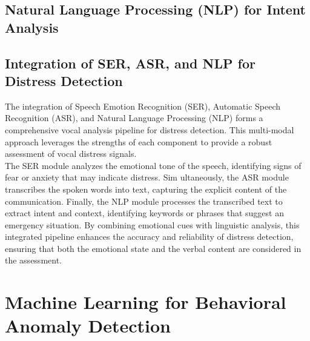\documentclass[12pt,a4paper,oneside,english]{book}
\begin{document}
{\subsection{Natural Language Processing (NLP) for Intent Analysis}%
\label{sec:nlp_intent}
%
%

\subsection{Integration of SER, ASR, and NLP for Distress Detection}%
\label{integration_ser_asr_nlp}
The integration of Speech Emotion Recognition (SER), Automatic Speech Recognition (ASR), and Natural Language Processing (NLP) forms a comprehensive vocal analysis pipeline for distress detection.
This multi-modal approach leverages the strengths of each component to provide a robust assessment of vocal distress signals.
\\The SER module analyzes the emotional tone of the speech, identifying signs of fear or anxiety that may indicate distress.
Sim ultaneously, the ASR module transcribes the spoken words into text, capturing the explicit content of the communication.
Finally, the NLP module processes the transcribed text to extract intent and context, identifying keywords or phrases that suggest an emergency situation.
By combining emotional cues with linguistic analysis, this integrated pipeline enhances the accuracy and reliability of distress detection, ensuring that both the emotional state and the verbal content are considered in the assessment.


\section{Machine Learning for Behavioral Anomaly Detection}
\label{sec:behavioral_theory}
}
\end{document}
